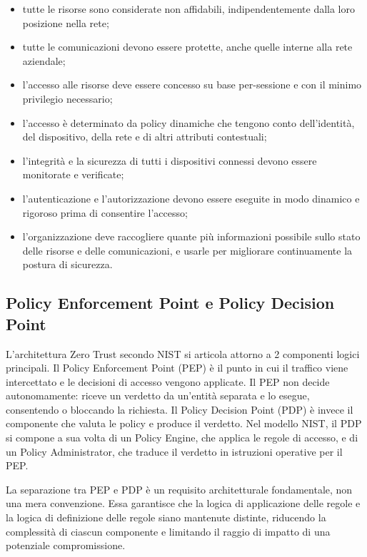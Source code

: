 \begin{itemize}
\item tutte le risorse sono considerate non affidabili, indipendentemente dalla loro posizione nella rete;
\item tutte le comunicazioni devono essere protette, anche quelle interne alla rete aziendale;
\item l'accesso alle risorse deve essere concesso su base per-sessione e con il minimo privilegio necessario;
\item l'accesso è determinato da policy dinamiche che tengono conto dell'identità, del dispositivo, della rete e di altri attributi contestuali;
\item l'integrità e la sicurezza di tutti i dispositivi connessi devono essere monitorate e verificate;
\item l'autenticazione e l'autorizzazione devono essere eseguite in modo dinamico e rigoroso prima di consentire l'accesso;
\item l'organizzazione deve raccogliere quante più informazioni possibile sullo stato delle risorse e delle comunicazioni, e usarle per migliorare continuamente la postura di sicurezza.
\end{itemize}

\subsection{Policy Enforcement Point e Policy Decision Point}

L'architettura Zero Trust secondo NIST si articola attorno a 2 componenti logici principali. Il Policy Enforcement Point (PEP) è il punto in cui il traffico viene intercettato e le decisioni di accesso vengono applicate. Il PEP non decide autonomamente: riceve un verdetto da un'entità separata e lo esegue, consentendo o bloccando la richiesta. Il Policy Decision Point (PDP) è invece il componente che valuta le policy e produce il verdetto. Nel modello NIST, il PDP si compone a sua volta di un Policy Engine, che applica le regole di accesso, e di un Policy Administrator, che traduce il verdetto in istruzioni operative per il PEP.

La separazione tra PEP e PDP è un requisito architetturale fondamentale, non una mera convenzione. Essa garantisce che la logica di applicazione delle regole e la logica di definizione delle regole siano mantenute distinte, riducendo la complessità di ciascun componente e limitando il raggio di impatto di una potenziale compromissione.

